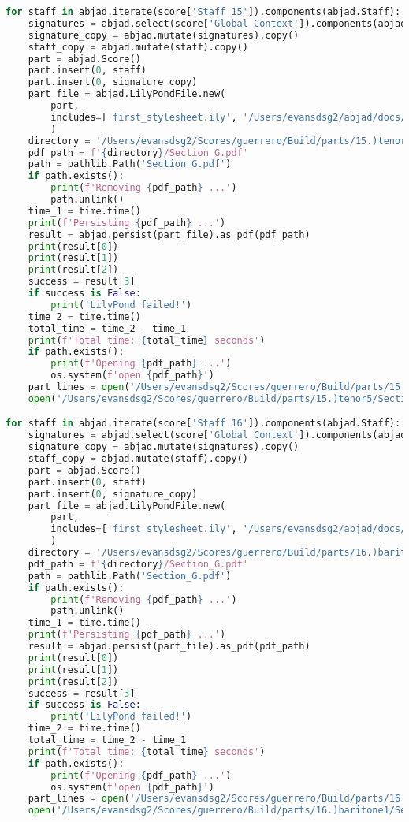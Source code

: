\begin{lstlisting}[language=Python, caption=Invocation Source Code]
for staff in abjad.iterate(score['Staff 15']).components(abjad.Staff):
    signatures = abjad.select(score['Global Context']).components(abjad.Staff)
    signature_copy = abjad.mutate(signatures).copy()
    staff_copy = abjad.mutate(staff).copy()
    part = abjad.Score()
    part.insert(0, staff)
    part.insert(0, signature_copy)
    part_file = abjad.LilyPondFile.new(
        part,
        includes=['first_stylesheet.ily', '/Users/evansdsg2/abjad/docs/source/_stylesheets/abjad.ily'],
        )
    directory = '/Users/evansdsg2/Scores/guerrero/Build/parts/15.)tenor5'
    pdf_path = f'{directory}/Section_G.pdf'
    path = pathlib.Path('Section_G.pdf')
    if path.exists():
        print(f'Removing {pdf_path} ...')
        path.unlink()
    time_1 = time.time()
    print(f'Persisting {pdf_path} ...')
    result = abjad.persist(part_file).as_pdf(pdf_path)
    print(result[0])
    print(result[1])
    print(result[2])
    success = result[3]
    if success is False:
        print('LilyPond failed!')
    time_2 = time.time()
    total_time = time_2 - time_1
    print(f'Total time: {total_time} seconds')
    if path.exists():
        print(f'Opening {pdf_path} ...')
        os.system(f'open {pdf_path}')
    part_lines = open('/Users/evansdsg2/Scores/guerrero/Build/parts/15.)tenor5/Section_G.ly').readlines()
    open('/Users/evansdsg2/Scores/guerrero/Build/parts/15.)tenor5/Section_G.ly', 'w').writelines(part_lines[15:-1])

for staff in abjad.iterate(score['Staff 16']).components(abjad.Staff):
    signatures = abjad.select(score['Global Context']).components(abjad.Staff)
    signature_copy = abjad.mutate(signatures).copy()
    staff_copy = abjad.mutate(staff).copy()
    part = abjad.Score()
    part.insert(0, staff)
    part.insert(0, signature_copy)
    part_file = abjad.LilyPondFile.new(
        part,
        includes=['first_stylesheet.ily', '/Users/evansdsg2/abjad/docs/source/_stylesheets/abjad.ily'],
        )
    directory = '/Users/evansdsg2/Scores/guerrero/Build/parts/16.)baritone1'
    pdf_path = f'{directory}/Section_G.pdf'
    path = pathlib.Path('Section_G.pdf')
    if path.exists():
        print(f'Removing {pdf_path} ...')
        path.unlink()
    time_1 = time.time()
    print(f'Persisting {pdf_path} ...')
    result = abjad.persist(part_file).as_pdf(pdf_path)
    print(result[0])
    print(result[1])
    print(result[2])
    success = result[3]
    if success is False:
        print('LilyPond failed!')
    time_2 = time.time()
    total_time = time_2 - time_1
    print(f'Total time: {total_time} seconds')
    if path.exists():
        print(f'Opening {pdf_path} ...')
        os.system(f'open {pdf_path}')
    part_lines = open('/Users/evansdsg2/Scores/guerrero/Build/parts/16.)baritone1/Section_G.ly').readlines()
    open('/Users/evansdsg2/Scores/guerrero/Build/parts/16.)baritone1/Section_G.ly', 'w').writelines(part_lines[15:-1])


\end{lstlisting}
